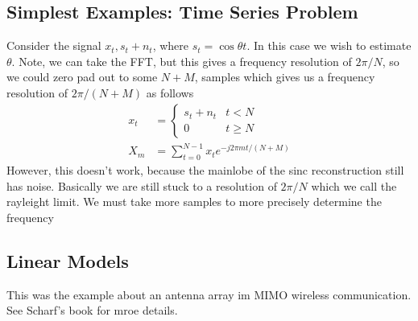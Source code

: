 \documentclass[a4paper]{article}
\begin{document}
\subsection*{Simplest Examples: Time Series Problem}%
\label{sub:Simplest Examples: Time Series Problem}
Consider the signal $x_t, s_t + n_t$, where $s_t = \cos \theta t$. In this case we wish to estimate $\theta$. Note, we can take the FFT, but this gives a frequency resolution of $2\pi/N$, so we could zero pad out to some $N + M$, samples which gives us a frequency resolution of $2 \pi/(N + M)$ as follows
\[
  \begin{aligned}
    x_t &=
    \begin{cases}
      s_t + n_t & t < N \\
      0 & t \geq N
    \end{cases} \\
  X_m &= \sum_{t=0}^{N-1} x_t e^{-j2\pi mt/(N+M)}
  \end{aligned}
\]
However, this doesn't work, because the mainlobe of the sinc reconstruction still has noise. Basically we are still stuck to a resolution of $2\pi/N$ which we call the rayleight limit. We must take more samples to more precisely determine the frequency

\subsection*{Linear Models}%
\label{sub:Linear Models}
This was the example about an antenna array im MIMO wireless communication. See Scharf's book for mroe details.
\end{document}
